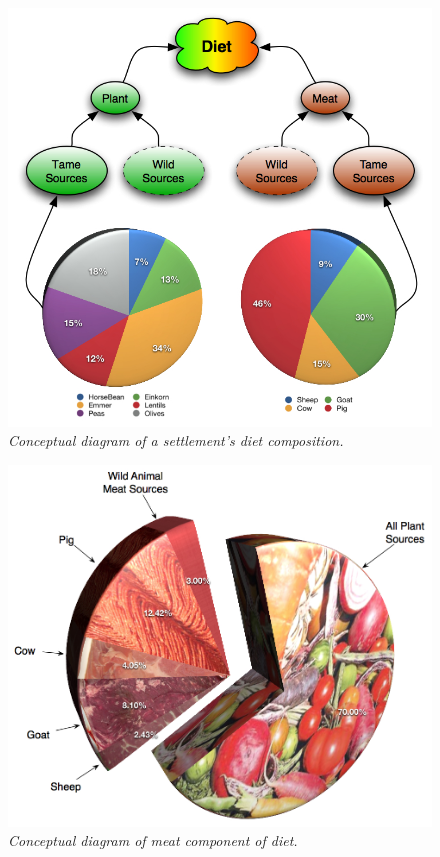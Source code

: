 \begin{figure}[htbp] %
  \includegraphics[scale=.31]{./images/dietDiagram.jpg}
  \caption{\label{fig:dietDiagram}\textit{Conceptual diagram of a settlement's
    diet composition.}}
\end{figure}
\begin{figure}[htbp] %
  \includegraphics[scale=.23]{./images/fancyDietMeat.jpg}
  \caption[Plant Portion of Diet]{\label{fig:dietMeatDiagram}\textit{Conceptual
    diagram of meat component of diet.}}
\end{figure}
